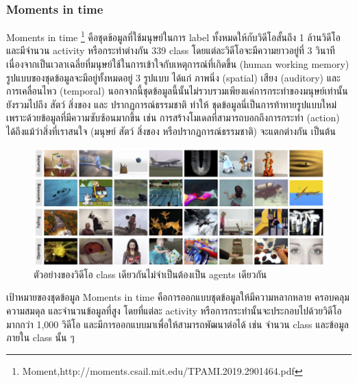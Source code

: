 \subsubsection*{Moments in time}
Moments in time \footnote{Moment,http://moments.csail.mit.edu/TPAMI.2019.2901464.pdf} คือชุดข้อมูลที่ใช้มนุษย์ในการ label ทั้งหมดให้กับวิดีโอสั้นถึง 1 ล้านวิดีโอ และมีจำนวน activity หรือกระทำต่างกัน 339 class โดยแต่ละวิดีโอจะมีความยาวอยู่ที่ 3 วินาที เนื่องจากเป็นเวลาเฉลี่ยที่มนุษย์ใช้ในการเข้าใจกับเหตุการณ์ที่เกิดขึ้น (human working memory) รูปแบบของชุดข้อมูลจะมีอยู่ทั้งหมดอยู่ 3 รูปแบบ ได้แก่ ภาพนิ่ง (spatial) เสียง (auditory) และการเคลื่อนไหว (temporal) นอกจากนี้ชุดข้อมูลนี้นั้นไม่รวบรวมเพียงแค่การกระทำของมนุษย์เท่านั้น ยังรวมไปถึง สัตว์ สิ่งของ และ ปรากฏการณ์ธรรมชาติ ทำให้ ชุดข้อมูลนี่เป็นการท้าทายรูปแบบใหม่เพราะด้วยข้อมูลที่มีความซับซ้อนมากขึ้น เช่น การสร้างโมเดลที่สามารถบอกถึงการกระทำ (action) ได้ถึงแม้ว่าสิ่งที่เราสนใจ (มนุษย์ สัตว์ สิ่งของ หรือปรากฏการณ์ธรรมชาติ) จะแตกต่างกัน เป็นต้น

\begin{figure}[!ht]
	\centering
	\includegraphics[width=1\textwidth]{chapter2/images/Example_of_class.png}
		\caption{ตัวอย่างของวิดีโอ class เดียวกันไม่จำเป็นต้องเป็น agents เดียวกัน}
    	\label{fig:moment_class}
\end{figure}

เป้าหมายของชุดข้อมูล Moments in time คือการออกแบบชุดข้อมูลให้มีความหลากหลาย ครอบคลุม ความสมดุล และจำนวนข้อมูลที่สูง โดยที่แต่ละ activity หรือการกระทำนั้นจะประกอบไปด้วยวิดีโอมากกว่า 1,000 วิดีโอ และมีการออกแบบมาเพื่อให้สามารถพัฒนาต่อได้ เช่น จำนวน class และข้อมูลภายใน class นั้น ๆ

\clearpage
